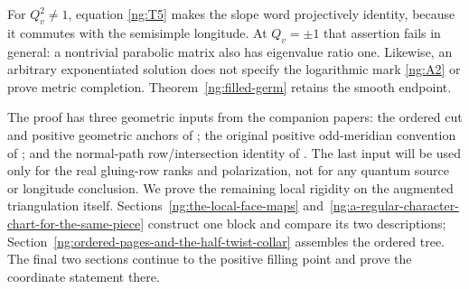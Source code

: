 \documentclass[11pt]{article}
\numberwithin{equation}{section}
\theoremstyle{definition}\newtheorem{definition}[theorem]{Definition}
\theoremstyle{remark}\newtheorem{remark}[theorem]{Remark}
\begin{document}
For $Q_v^2\ne1$, equation \eqref{ng:T5} makes the slope word
projectively identity, because it commutes with the semisimple
longitude. At $Q_v=\pm1$ that assertion fails in general:
a nontrivial parabolic matrix also has eigenvalue ratio one.
Likewise, an arbitrary exponentiated solution does not specify the
logarithmic mark \eqref{ng:A2} or prove metric completion.
Theorem~\ref{ng:filled-germ} retains the smooth endpoint.

The proof has three geometric inputs from the companion papers:
the ordered cut and positive geometric anchors of \cite{Circle};
the original positive odd-meridian convention of
\cite[Section~5, equations~(5.1)--(5.2)]{Strict}; and the
normal-path row/intersection identity of
\cite[Section~7.1, equation~(7.2)]{Marked}.
The last input will be used only for the real gluing-row ranks and
polarization, not for any quantum source or longitude conclusion.
We prove the remaining local rigidity on the augmented triangulation
itself. Sections~\ref{ng:the-local-face-maps} and~\ref{ng:a-regular-character-chart-for-the-same-piece}
construct one block and compare its two descriptions;
Section~\ref{ng:ordered-pages-and-the-half-twist-collar} assembles the
ordered tree. The final two sections continue to the positive filling
point and prove the coordinate statement there.






\end{document}
